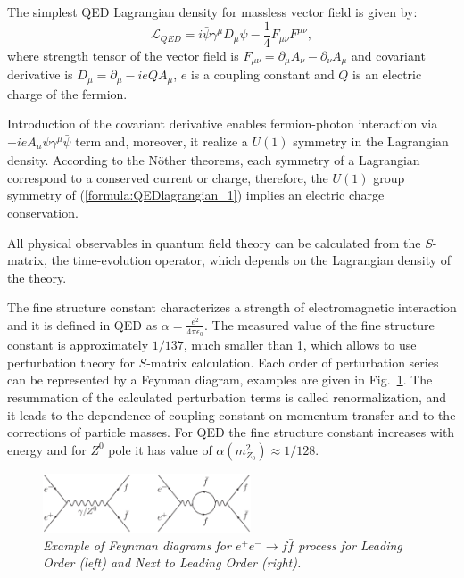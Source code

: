 The simplest QED Lagrangian density for massless vector field is given by:
\begin{equation}
	\mathcal{L}_{QED}=i\bar{\psi}\gamma^\mu D_\mu \psi - \frac{1}{4}F_{\mu\nu}F^{\mu\nu},
    \label{formula:QEDlagrangian_1}
\end{equation}
where strength tensor of the vector field is $F_{\mu\nu}=\partial_\mu A_\nu - \partial_\nu A_\mu$
and covariant derivative is $D_\mu = \partial_\mu - ieQ A_\mu$, $e$ is a coupling constant and $Q$ is an electric charge of the fermion. 

Introduction of the covariant derivative enables fermion-photon interaction via $-ieA_\mu\psi\gamma^\mu\bar{\psi}$ term and, moreover, it realize a $U(1)$ symmetry in the Lagrangian density. According to the N\"other theorems, each symmetry of a Lagrangian correspond to a conserved current or charge, therefore, the $U(1)$ group symmetry of (\ref{formula:QEDlagrangian_1}) implies an electric charge conservation.

All physical observables in quantum field theory can be calculated from the $S$-matrix, the time-evolution operator, which depends on the Lagrangian density of the theory. 

The fine structure constant characterizes a strength of electromagnetic interaction and it is defined in QED as $\alpha = \frac{e^2}{4\pi\epsilon_0}$. The measured value of the fine structure constant is approximately $1/137$, much smaller than 1, which allows to use perturbation theory for $S$-matrix calculation. Each order of perturbation series can be represented by a Feynman diagram, examples are given in Fig.~\ref{fig:FeynmanSM}. The resummation of the calculated perturbation terms is called renormalization, and it leads to the dependence of coupling constant on momentum transfer and to the corrections of particle masses. For QED the fine structure constant increases with energy and for $Z^0$ pole it has value of $\alpha(m_{Z_0}^2) \approx 1/128$.

\begin{figure}[h]
{\centering
    \includegraphics[width=0.55\textwidth]{graphics/FeynmanSM.eps}
    \caption{\sl Example of Feynman diagrams for $e^+e^- \to f\bar{f}$ process for Leading Order (left) and Next to Leading Order (right). }
    \label{fig:FeynmanSM}
  }
\end{figure}

